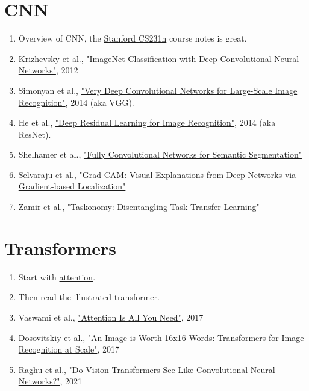 \documentclass[12pt,letterpaper]{article}
\begin{document}
\section*{CNN}
\begin{enumerate}
    \item Overview of CNN, the \href{https://cs231n.github.io/}{Stanford CS231n} course notes is great.
    \item Krizhevsky et al., 
    \href{https://proceedings.neurips.cc/paper/2012/file/c399862d3b9d6b76c8436e924a68c45b-Paper.pdf}{"ImageNet Classification with Deep Convolutional Neural Networks"}, 2012
    \item Simonyan et al., 
    \href{https://arxiv.org/abs/1409.1556}{"Very Deep Convolutional Networks for Large-Scale Image Recognition"}, 2014 (aka VGG).
    \item He et al.,
    \href{https://arxiv.org/abs/1409.1556}{"Deep Residual Learning for Image Recognition"}, 2014 (aka ResNet). 
    \item Shelhamer et al., 
    \href{https://arxiv.org/abs/1605.06211}{"Fully Convolutional Networks for Semantic Segmentation"}
    \item Selvaraju et al., 
    \href{https://arxiv.org/abs/1610.02391}{"Grad-CAM: Visual Explanations from Deep Networks via Gradient-based Localization"}
    \item Zamir et al., 
    \href{http://taskonomy.stanford.edu/taskonomy_CVPR2018.pdf}{"Taskonomy: Disentangling Task Transfer Learning"}
\end{enumerate}

\section*{Transformers}
\begin{enumerate}
    \item Start with \href{https://jalammar.github.io/visualizing-neural-machine-translation-mechanics-of-seq2seq-models-with-attention/}{attention}.
    \item Then read
    \href{https://jalammar.github.io/illustrated-transformer/}{the illustrated transformer}.
    \item Vaswami et al., \href{https://arxiv.org/abs/1706.03762}{"Attention Is All You Need"}, 2017
    \item Dosovitskiy et al., \href{https://arxiv.org/abs/2010.11929}{"An Image is Worth 16x16 Words: Transformers for Image Recognition at Scale"}, 2017
    \item Raghu et al., \href{https://arxiv.org/abs/2010.11929}{"Do Vision Transformers See Like Convolutional Neural Networks?"}, 2021
\end{enumerate} 
\end{document}
